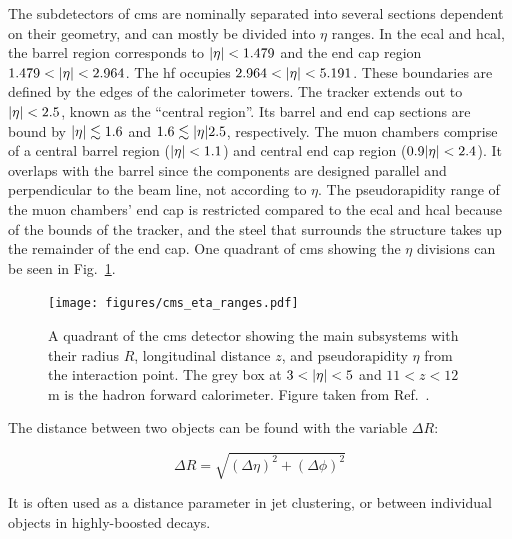The subdetectors of \acrshort{cms} are nominally separated into several sections dependent on their geometry, and can mostly be divided into $\eta$ ranges. In the \acrshort{ecal} and \acrshort{hcal}, the barrel region corresponds to $\lvert \eta \rvert < \text{1.479}$ and the end cap region $\text{1.479} < \lvert \eta \rvert < \text{2.964}$. The \acrshort{hf} occupies $\text{2.964} < \lvert \eta \rvert < \text{5.191}$. These boundaries are defined by the edges of the calorimeter towers. The tracker extends out to $\lvert \eta \rvert < \text{2.5}$, known as the ``central region''. Its barrel and end cap sections are bound by $\lvert \eta \rvert \lesssim \text{1.6}$ and $\text{1.6} \lesssim \lvert \eta \rvert \text{2.5}$, respectively. The muon chambers comprise of a central barrel region ($\lvert \eta \rvert < \text{1.1}$) and central end cap region ($\text{0.9} \lvert \eta \rvert < \text{2.4}$). It overlaps with the barrel since the components are designed parallel and perpendicular to the beam line, not according to $\eta$. The pseudorapidity range of the muon chambers' end cap is restricted compared to the \acrshort{ecal} and \acrshort{hcal} because of the bounds of the tracker, and the steel that surrounds the structure takes up the remainder of the end cap. One quadrant of \acrshort{cms} showing the $\eta$ divisions can be seen in Fig.~\ref{fig:cms_eta_bounds}.

\begin{figure}[htbp]
    \centering
    \texttt{[image: figures/cms\_eta\_ranges.pdf]}
    \caption[A quadrant of the CMS detector showing the main subsystems with their radius $R$, longitudinal distance $z$, and pseudorapidity $\eta$ from the interaction point]{A quadrant of the \acrshort{cms} detector showing the main subsystems with their radius $R$, longitudinal distance $z$, and pseudorapidity $\eta$ from the interaction point. The grey box at $3 < \lvert \eta \rvert < 5$ and $11 < z < 12$\,m is the hadron forward calorimeter. Figure taken from Ref.~.}
    \label{fig:cms_eta_bounds}
\end{figure}

The distance between two objects can be found with the variable $\Delta R$:

\begin{equation}
\Delta R = \sqrt{(\Delta \eta)^2 + (\Delta \phi)^2}
\label{eq:delta_r}
\end{equation}

It is often used as a distance parameter in jet clustering, or between individual objects in highly-boosted decays.




